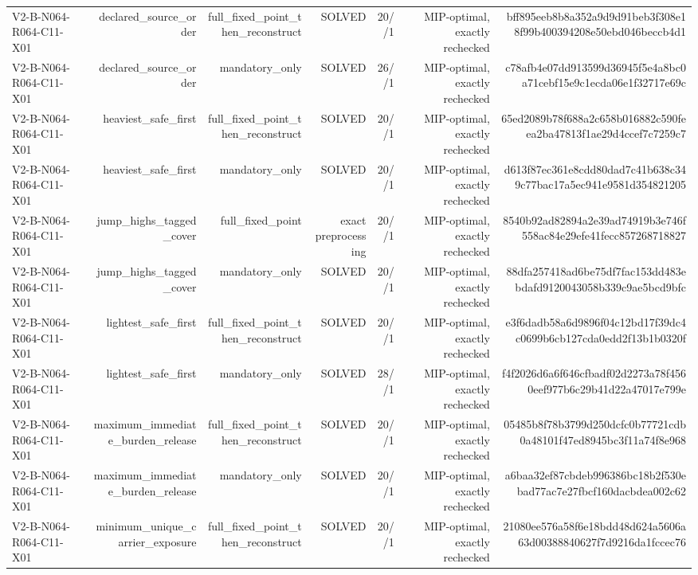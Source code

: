 {\begin{longtable}{lrrrrrr}
V2-B-N064-R064-C11-X01 & declared\_source\_order & full\_fixed\_point\_then\_reconstruct & SOLVED & 20//1 & MIP-optimal, exactly rechecked & bff895eeb8b8a352a9d9d91beb3f308e18f99b400394208e50ebd046beccb4d1 \\
V2-B-N064-R064-C11-X01 & declared\_source\_order & mandatory\_only & SOLVED & 26//1 & MIP-optimal, exactly rechecked & c78afb4e07dd913599d36945f5e4a8bc0a71cebf15e9c1ecda06e1f32717e69c \\
V2-B-N064-R064-C11-X01 & heaviest\_safe\_first & full\_fixed\_point\_then\_reconstruct & SOLVED & 20//1 & MIP-optimal, exactly rechecked & 65ed2089b78f688a2c658b016882c590feea2ba47813f1ae29d4ccef7c7259c7 \\
V2-B-N064-R064-C11-X01 & heaviest\_safe\_first & mandatory\_only & SOLVED & 20//1 & MIP-optimal, exactly rechecked & d613f87ec361e8cdd80dad7c41b638c349c77bac17a5ec941e9581d354821205 \\
V2-B-N064-R064-C11-X01 & jump\_highs\_tagged\_cover & full\_fixed\_point & exact preprocessing & 20//1 & MIP-optimal, exactly rechecked & 8540b92ad82894a2e39ad74919b3e746f558ac84e29efe41fecc857268718827 \\
V2-B-N064-R064-C11-X01 & jump\_highs\_tagged\_cover & mandatory\_only & SOLVED & 20//1 & MIP-optimal, exactly rechecked & 88dfa257418ad6be75df7fac153dd483ebdafd9120043058b339c9ae5bcd9bfc \\
V2-B-N064-R064-C11-X01 & lightest\_safe\_first & full\_fixed\_point\_then\_reconstruct & SOLVED & 20//1 & MIP-optimal, exactly rechecked & e3f6dadb58a6d9896f04c12bd17f39dc4c0699b6cb127cda0edd2f13b1b0320f \\
V2-B-N064-R064-C11-X01 & lightest\_safe\_first & mandatory\_only & SOLVED & 28//1 & MIP-optimal, exactly rechecked & f4f2026d6a6f646cfbadf02d2273a78f4560eef977b6c29b41d22a47017e799e \\
V2-B-N064-R064-C11-X01 & maximum\_immediate\_burden\_release & full\_fixed\_point\_then\_reconstruct & SOLVED & 20//1 & MIP-optimal, exactly rechecked & 05485b8f78b3799d250dcfc0b77721cdb0a48101f47ed8945bc3f11a74f8e968 \\
V2-B-N064-R064-C11-X01 & maximum\_immediate\_burden\_release & mandatory\_only & SOLVED & 20//1 & MIP-optimal, exactly rechecked & a6baa32ef87cbdeb996386bc18b2f530ebad77ac7e27fbcf160dacbdea002c62 \\
V2-B-N064-R064-C11-X01 & minimum\_unique\_carrier\_exposure & full\_fixed\_point\_then\_reconstruct & SOLVED & 20//1 & MIP-optimal, exactly rechecked & 21080ee576a58f6e18bdd48d624a5606a63d00388840627f7d9216da1fccec76 \\

\end{longtable}}
